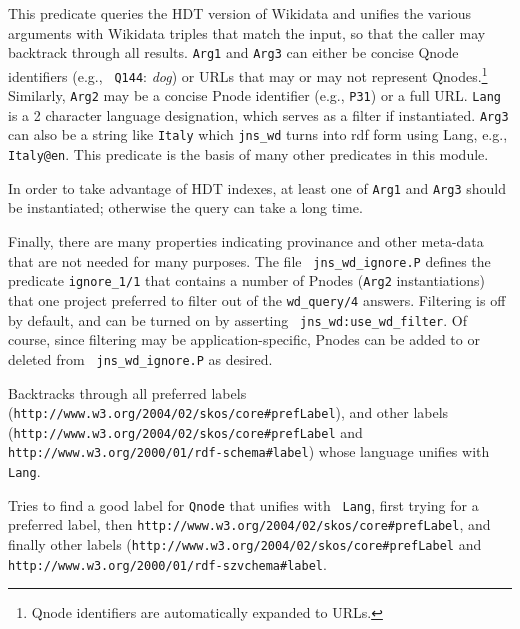 \begin{description}
  This predicate queries the HDT version of Wikidata and unifies the
  various arguments with Wikidata triples that match the input, so
  that the caller may backtrack through all results.  {\tt Arg1} and
  {\tt Arg3} can either be concise Qnode identifiers (e.g., {\tt
    Q144}: {\em dog}) or URLs that may or may not represent
  Qnodes.\footnote{Qnode identifiers are automatically expanded to
  URLs.}  Similarly, {\tt Arg2} may be a concise Pnode identifier
  (e.g., {\tt P31}) or a full URL. {\tt Lang} is a 2 character language
  designation, which serves as a filter if instantiated.  {\tt Arg3}
  can also be a string like {\tt Italy} which {\tt jns\_wd} turns into
  rdf form using Lang, e.g., {\tt Italy@en}.  This predicate is the
  basis of many other predicates in this module.

 In order to take advantage of HDT indexes, at least one of {\tt Arg1}
 and {\tt Arg3} should be instantiated; otherwise the query can take a
 long time.

Finally, there are many properties indicating provinance and other
meta-data that are not needed for many purposes.  The file {\tt
  jns\_wd\_ignore.P} defines the predicate {\tt ignore\_1/1} that
contains a number of Pnodes ({\tt Arg2} instantiations) that one
project preferred to filter out of the {\tt wd\_query/4} answers.
Filtering is off by default, and can be turned on by asserting {\tt
  jns\_wd:use\_wd\_filter}.  Of course, since filtering may be
application-specific, Pnodes can be added to or deleted from {\tt
  jns\_wd\_ignore.P} as desired.

Backtracks through all preferred labels
(\verb|http://www.w3.org/2004/02/skos/core#prefLabel|), and other
labels (\verb|http://www.w3.org/2004/02/skos/core#prefLabel| and \\
  \verb|http://www.w3.org/2000/01/rdf-schema#label|) whose language
  unifies with {\tt Lang}.

Tries to find a good label for {\tt Qnode} that unifies with {\tt
  Lang}, first trying for a preferred label, then
\verb|http://www.w3.org/2004/02/skos/core#prefLabel|, and finally
other labels (\verb|http://www.w3.org/2004/02/skos/core#prefLabel| and \\
\verb|http://www.w3.org/2000/01/rdf-szvchema#label|.


\end{description}
